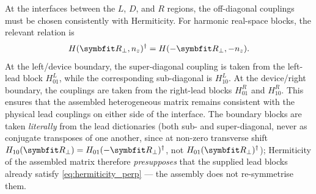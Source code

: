 At the interfaces between the $L$, $D$, and $R$ regions, the
off-diagonal couplings must be chosen consistently with Hermiticity.
For harmonic real-space blocks, the relevant relation is
\begin{equation}\label{eq:hermiticity_perp}
  H(\vc{R}_\perp,n_z)^\dagger
  = H(-\vc{R}_\perp,-n_z).
\end{equation}
At the left/device boundary, the super-diagonal coupling is taken from
the left-lead block $H_{01}^L$, while the corresponding sub-diagonal is
$H_{10}^L$.  At the device/right boundary, the couplings are taken from
the right-lead blocks $H_{01}^R$ and $H_{10}^R$.  This ensures that the
assembled heterogeneous matrix remains consistent with the physical lead
couplings on either side of the interface.  The boundary blocks are taken
\emph{literally} from the lead dictionaries (both sub- and super-diagonal,
never as conjugate transposes of one another, since at non-zero transverse
shift $H_{10}(\vc{R}_\perp)=H_{01}(-\vc{R}_\perp)^\dagger$, not
$H_{01}(\vc{R}_\perp)^\dagger$); Hermiticity of the assembled matrix
therefore \emph{presupposes} that the supplied lead blocks already satisfy
\cref{eq:hermiticity_perp} --- the assembly does not re-symmetrise them.
